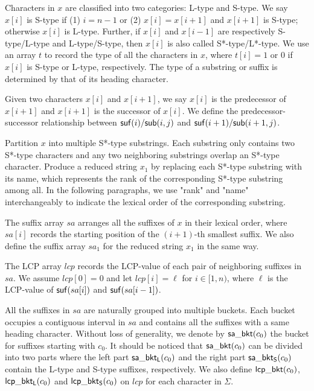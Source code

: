 \documentclass[10pt,journal,compsoc]{IEEEtran}
\begin{document}
Characters in $x$ are classified into two categories: L-type and S-type. We say $x[i]$ is S-type if (1) $i = n - 1$ or (2) $x[i] = x[i + 1]$ and $x[i + 1]$ is S-type; otherwise $x[i]$ is L-type. Further, if $x[i]$ and $x[i - 1]$ are respectively S-type/L-type and L-type/S-type, then $x[i]$ is also called S*-type/L*-type. We use an array $t$ to record the type of all the characters in $x$, where $t[i] = 1$ or $0$ if $x[i]$ is S-type or L-type, respectively. The type of a substring or suffix is determined by that of its heading character.

Given two characters $x[i]$ and $x[i + 1]$, we say $x[i]$ is the predecessor of $x[i + 1]$ and $x[i + 1]$ is the successor of $x[i]$. We define the predecessor-successor relationship between ${\sf suf}(i)/{\sf sub}(i, j)$ and ${\sf suf}(i + 1)/{\sf sub}(i + 1, j)$.

Partition $x$ into multiple S*-type substrings. Each substring only contains two S*-type characters and any two neighboring substrings overlap an S*-type character. Produce a reduced string $x_1$ by replacing each S*-type substring with its name, which represents the rank of the corresponding S*-type substring among all. In the following paragraphs, we use "rank" and "name" interchangeably to indicate the lexical order of the corresponding substring.

The suffix array $sa$ arranges all the suffixes of $x$ in their lexical order, where $sa[i]$ records the starting position of the $(i + 1)$-th smallest suffix. We also define the suffix array $sa_1$ for the reduced string $x_1$ in the same way.

The LCP array $lcp$ records the LCP-value of each pair of neighboring suffixes in $sa$. We assume $lcp[0] = 0$ and let $lcp[i] = \ell$ for $i \in [1, n)$, where $\ell$ is the LCP-value of ${\sf suf}(sa[i])$ and ${\sf suf}(sa[i - 1])$.

All the suffixes in $sa$ are naturally grouped into multiple buckets. Each bucket occupies a contiguous interval in $sa$ and contains all the suffixes with a same heading character. Without loss of generality, we denote by ${\sf sa\_bkt}(c_0)$ the bucket for suffixes starting with $c_0$. It should be noticed that ${\sf sa\_bkt}(c_0)$ can be divided into two parts where the left part ${\sf sa\_bkt_L}(c_0)$ and the right part ${\sf sa\_bkt_S}(c_0)$ contain the L-type and S-type suffixes, respectively. We also define ${\sf lcp\_bkt}(c_0)$, ${\sf lcp\_bkt_L}(c_0)$ and ${\sf lcp\_bkt_S}(c_0)$ on $lcp$ for each character in $\Sigma$.
\end{document}
